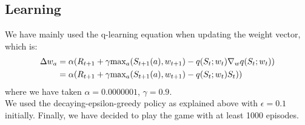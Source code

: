 \subsection{Learning}
We have mainly used the q-learning equation when updating the weight vector, which is:
\begin{align}
\Delta w_a
& = \alpha(R_{t+1} + \gamma \mbox{max}_{a}(S_{t+1} (a), w_{t+1}) - q(S_{t}; w_{t})  \nabla_{w} q(S_{t}; w_{t}))
\\ %
& =  \alpha(R_{t+1} + \gamma \mbox{max}_{a}(S_{t+1} (a), w_{t+1}) - q(S_{t}; w_{t})  S_{t}))
\notag %
\end{align}
where we have taken $\alpha = 0.0000001$, $\gamma = 0.9$. 
\\

We used the decaying-epsilon-greedy policy as explained above with $\epsilon=0.1$ initially. Finally, we have decided to play the game with at least 1000 episodes.

